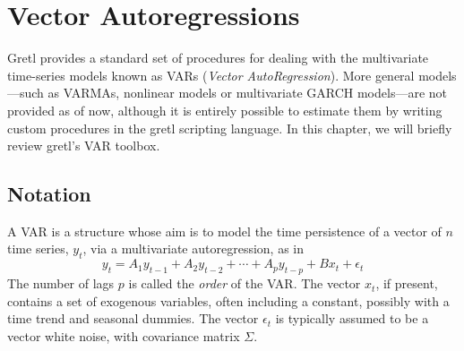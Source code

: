 \chapter{Vector Autoregressions}
\label{chap:var}

Gretl provides a standard set of procedures for dealing with the
multivariate time-series models known as VARs (\emph{Vector
  AutoRegression}). More general models---such as VARMAs, nonlinear
models or multivariate GARCH models---are not provided as of now,
although it is entirely possible to estimate them by writing custom
procedures in the gretl scripting language. In this chapter, we
will briefly review gretl's VAR toolbox.

\section{Notation}
\label{sec:var-def}

A VAR is a structure whose aim is to model the time persistence of a
vector of $n$ time series, $y_t$, via a multivariate autoregression,
as in
\begin{equation}
  \label{eq:VAR}
  y_t = A_1 y_{t-1} + A_2 y_{t-2} + \cdots + A_p y_{t-p} +
  B x_t + \epsilon_t 
\end{equation}
The number of lags $p$ is called the \emph{order} of the VAR. The
vector $x_t$, if present, contains a set of exogenous variables, often
including a constant, possibly with a time trend and seasonal
dummies. The vector $\epsilon_t$ is typically assumed to be a vector
white noise, with covariance matrix $\Sigma$.

